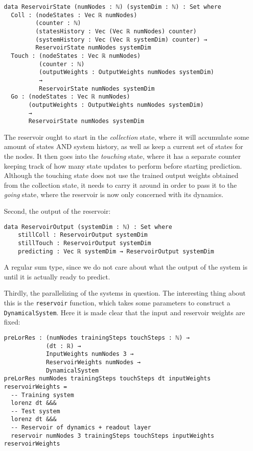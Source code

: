 \begin{verbatim}
data ReservoirState (numNodes : ℕ) (systemDim : ℕ) : Set where
  Coll : (nodeStates : Vec ℝ numNodes)
         (counter : ℕ)
         (statesHistory : Vec (Vec ℝ numNodes) counter) 
         (systemHistory : Vec (Vec ℝ systemDim) counter) → 
         ReservoirState numNodes systemDim
  Touch : (nodeStates : Vec ℝ numNodes)
          (counter : ℕ)
          (outputWeights : OutputWeights numNodes systemDim) 
          →
          ReservoirState numNodes systemDim
  Go : (nodeStates : Vec ℝ numNodes)
       (outputWeights : OutputWeights numNodes systemDim)
       →
       ReservoirState numNodes systemDim

\end{verbatim}
The reservoir ought to start in the \textit{collection} state, where it will accumulate some amount of states AND system history, as well as keep a current set of states for the nodes. It then goes into the \textit{touching} state, where it has a separate counter keeping track of how many state updates to perform before starting prediction. Although the touching state does not use the trained output weights obtained from the collection state, it needs to carry it around in order to pass it to the \textit{going} state, where the reservoir is now only concerned with its dynamics.

Second, the output of the reservoir:
\begin{verbatim}
data ReservoirOutput (systemDim : ℕ) : Set where
    stillColl : ReservoirOutput systemDim
    stillTouch : ReservoirOutput systemDim
    predicting : Vec ℝ systemDim → ReservoirOutput systemDim
\end{verbatim}

A regular sum type, since we do not care about what the output of the system is until it is actually ready to predict.

Thirdly, the parallelizing of the systems in question. The interesting thing about this is the \texttt{reservoir} function, which takes some parameters to construct a \texttt{DynamicalSystem}. Here it is made clear that the input and reservoir weights are fixed:

\begin{verbatim}
preLorRes : (numNodes trainingSteps touchSteps : ℕ) → 
            (dt : ℝ) → 
            InputWeights numNodes 3 → 
            ReservoirWeights numNodes → 
            DynamicalSystem
preLorRes numNodes trainingSteps touchSteps dt inputWeights reservoirWeights = 
  -- Training system
  lorenz dt &&& 
  -- Test system
  lorenz dt &&&
  -- Reservoir of dynamics + readout layer
  reservoir numNodes 3 trainingSteps touchSteps inputWeights reservoirWeights
\end{verbatim}

